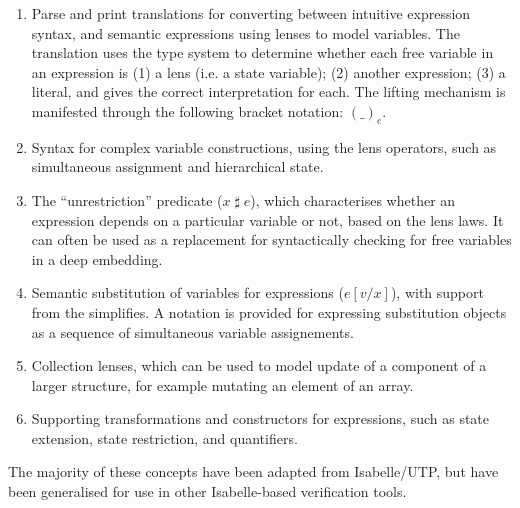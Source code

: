\documentclass[11pt,a4paper]{article}
\begin{document}
\begin{enumerate}
  \item Parse and print translations for converting between intuitive expression syntax,
    and semantic expressions using lenses to model variables. The translation uses the type
    system to determine whether each free variable in an expression is (1) a lens (i.e. a state 
    variable); (2) another expression; (3) a literal, and gives the correct interpretation for each.
    The lifting mechanism is manifested through the following bracket notation: $(\_)_e$.
  \item Syntax for complex variable constructions, using the lens operators, such as simultaneous 
    assignment and hierarchical state.
  \item The ``unrestriction'' predicate ($x \mathop{\sharp} e$), which characterises whether an expression depends on a
    particular variable or not, based on the lens laws. It can often be used as a replacement for 
    syntactically checking for free variables in a deep embedding.
  \item Semantic substitution of variables for expressions ($e[v/x]$), with support from the simplifies. A
    notation is provided for expressing substitution objects as a sequence of simultaneous 
    variable assignements.
  \item Collection lenses, which can be used to model update of a component of a larger structure,
    for example mutating an element of an array.
  \item Supporting transformations and constructors for expressions, such as state extension, 
    state restriction, and quantifiers.
\end{enumerate}

The majority of these concepts have been adapted from Isabelle/UTP, but have been generalised for
use in other Isabelle-based verification tools.





\end{document}
